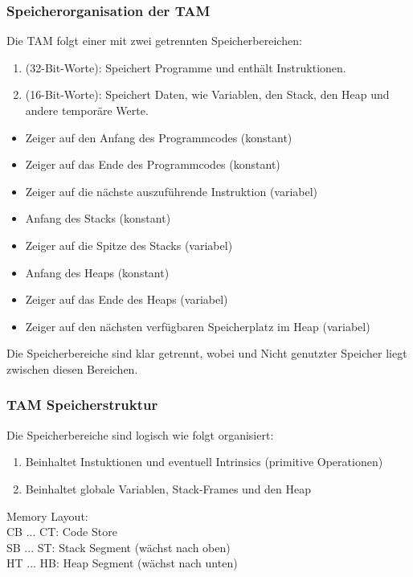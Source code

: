 \subsubsection{Speicherorganisation der TAM}
Die TAM folgt einer  mit zwei getrennten Speicherbereichen:
\begin{enumerate}
    \item {} (32-Bit-Worte): Speichert Programme und enthält Instruktionen.
    \item {} (16-Bit-Worte): Speichert Daten, wie Variablen, den Stack, den Heap und andere temporäre Werte.
\end{enumerate}
\begin{itemize}
    \item {} Zeiger auf den Anfang des Programmcodes (konstant)
    \item {} Zeiger auf das Ende des Programmcodes (konstant)
    \item {} Zeiger auf die nächste auszuführende Instruktion (variabel)
\end{itemize}
\begin{itemize}
    \item {} Anfang des Stacks (konstant)
    \item {} Zeiger auf die Spitze des Stacks (variabel)
    \item {} Anfang des Heaps (konstant)
    \item {} Zeiger auf das Ende des Heaps (variabel)
    \item {} Zeiger auf den nächsten verfügbaren Speicherplatz im Heap (variabel)
\end{itemize}
Die Speicherbereiche sind klar getrennt, wobei  und  Nicht genutzter Speicher liegt zwischen diesen Bereichen.
\subsubsection{TAM Speicherstruktur}
Die Speicherbereiche sind logisch wie folgt organisiert:
\begin{enumerate}
    \item {} Beinhaltet Instuktionen und eventuell Intrinsics (primitive Operationen)
    \item {} Beinhaltet globale Variablen, Stack-Frames und den Heap
\end{enumerate}
\begin{defBox}
    Memory Layout:\\
    CB ... CT: Code Store\\
    SB ... ST: Stack Segment (wächst nach oben)\\
    HT ... HB: Heap Segment (wächst nach unten)
\end{defBox}
